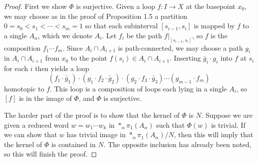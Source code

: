 \begin{proof}
    First we show $\Phi$ is surjective. Given a loop $f: I \to X$ at the basepoint $x_0$, we may choose as in the proof of Proposition 1.5 a partition $0 = s_0 < s_1 < \cdots < s_m = 1$ so that each subinterval $[s_{i-1}, s_i]$ is mapped by $f$ to a single $A_\alpha$, which we denote $A_i$. Let $f_i$ be the path $f|_{[s_{i-1}, s_i]}$, so $f$ is the composition $f_1 \cdots f_m$. Since $A_i \cap A_{i+1}$ is path-connected, we may choose a path $g_i$ in $A_i \cap A_{i+1}$ from $x_0$ to the point $f(s_i) \in A_i \cap A_{i+1}$. Inserting $\bar{g}_i \cdot g_i$ into $f$ at $s_i$ for each $i$ then yields a loop
\[
(f_1 \cdot \bar{g}_1) \cdot (g_1 \cdot f_2 \cdot \bar{g}_2) \cdot (g_2 \cdot f_3 \cdot \bar{g}_3) \cdots (g_{m-1} \cdot f_m)
\]
homotopic to $f$. This loop is a composition of loops each lying in a single $A_i$, so $[f]$ is in the image of $\Phi$, and $\Phi$ is surjective.

\begin{center}
\end{center}

The harder part of the proof is to show that the kernel of $\Phi$ is $N$. Suppose we are given a reduced word $w = w_1 \cdots w_k$ in $*_\alpha \pi_1(A_\alpha)$ such that $\Phi(w)$ is trivial. If we can show that $w$ has trivial image in $*_\alpha \pi_1(A_\alpha)/N$, then this will imply that the kernel of $\Phi$ is contained in $N$. The opposite inclusion has already been noted, so this will finish the proof.


\end{proof}
